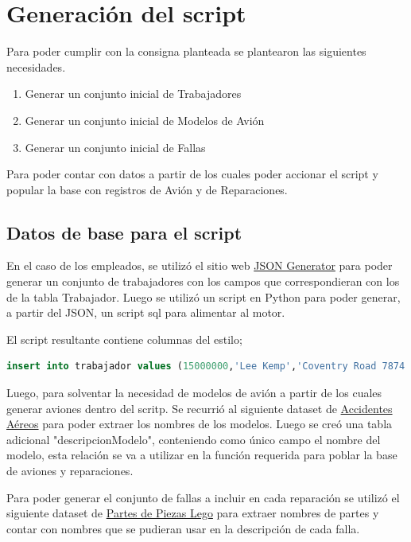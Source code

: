 \documentclass[12pt]{report}
\begin{document}
\newpage

\section*{Generación del script}

Para poder cumplir con la consigna planteada se plantearon las siguientes necesidades.

\begin{enumerate}
    \item Generar un conjunto inicial de Trabajadores
    \item Generar un conjunto inicial de Modelos de Avión
    \item Generar un conjunto inicial de Fallas
\end{enumerate}

Para poder contar con datos a partir de los cuales poder accionar el script y popular la base con registros de Avión y de Reparaciones.

\subsection*{Datos de base para el script}

En el caso de los empleados, se utilizó el sitio web  \href{https://www.json-generator.com/}{JSON Generator}  para poder generar un conjunto de trabajadores con los campos que correspondieran con los de la tabla Trabajador. Luego se utilizó un script en Python para poder generar, a partir del JSON, un script sql para alimentar al motor.

El script resultante contiene columnas del estilo;


\begin{lstlisting}[language=SQL]
insert into trabajador values (15000000,'Lee Kemp','Coventry Road 7874',148,'(935)425-2782',261);
\end{lstlisting}


Luego, para solventar la necesidad de modelos de avión a partir de los cuales generar aviones dentro del scritp. Se recurrió al siguiente dataset de \href{https://www.kaggle.com/saurograndi/airplane-crashes-since-1908/data}{Accidentes Aéreos} para poder extraer los nombres de los modelos. Luego se creó una tabla adicional "descripcionModelo", conteniendo como único campo el nombre del modelo, esta relación se va a utilizar en la función requerida para poblar la base de aviones y reparaciones.

Para poder generar el conjunto de fallas a incluir en cada reparación se utilizó el siguiente dataset de \href{https://www.kaggle.com/rtatman/lego-database/data}{Partes de Piezas Lego} para extraer nombres de partes y contar con nombres que se pudieran usar en la descripción de cada falla.
\end{document}

